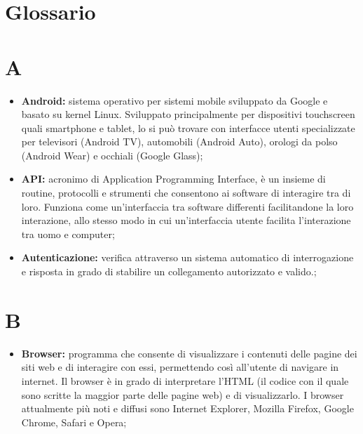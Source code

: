 %

\section{Glossario} %
\label{sec:glossario}

	\section*{\Huge A} %
		\begin{itemize}
			\item \textbf{Android:} sistema operativo per sistemi mobile sviluppato da Google e basato su kernel Linux. Sviluppato principalmente per dispositivi touchscreen quali smartphone e tablet, lo si può trovare con interfacce utenti specializzate per televisori (Android TV), automobili (Android Auto), orologi da polso (Android Wear) e occhiali (Google Glass);
			\item \textbf{API:} acronimo di Application Programming Interface, è un insieme di routine, protocolli e strumenti che consentono ai software di interagire tra di loro. Funziona come un'interfaccia tra software differenti facilitandone la loro interazione, allo stesso modo in cui un'interfaccia utente facilita l'interazione tra uomo e computer;
			\item \textbf{Autenticazione:} verifica attraverso un sistema automatico di interrogazione e risposta in grado di stabilire un collegamento autorizzato e valido.;
		\end{itemize}

	\section*{\Huge B} %
		\begin{itemize}
			\item \textbf{Browser:} programma che consente di visualizzare i contenuti delle pagine dei siti web e di interagire con essi, permettendo così all’utente di navigare in internet. Il browser è in grado di interpretare l’HTML (il codice con il quale sono scritte la maggior parte delle pagine web) e di visualizzarlo. I browser attualmente più noti e diffusi sono Internet Explorer, Mozilla Firefox, Google Chrome, Safari e Opera;
		\end{itemize}

